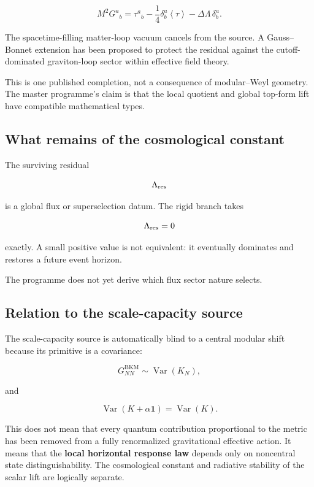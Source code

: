 \documentclass[
  11pt,
  letterpaper,
]{article}
\begin{document}
\[
M^2G^a{}_b
=\tau^a{}_b-\frac14\delta^a_b\left\langle \tau\right\rangle-\Delta\Lambda\,\delta^a_b.
\]

The spacetime-filling matter-loop vacuum cancels from the source. A
Gauss--Bonnet extension has been proposed to protect the residual
against the cutoff-dominated graviton-loop sector within effective field
theory.

This is one published completion, not a consequence of modular--Weyl
geometry. The master programme's claim is that the local quotient and
global top-form lift have compatible mathematical types.

\subsection{What remains of the cosmological
constant}\label{what-remains-of-the-cosmological-constant}

The surviving residual

\[
\Lambda_{\rm res}
\]

is a global flux or superselection datum. The rigid branch takes

\[
\Lambda_{\rm res}=0
\]

exactly. A small positive value is not equivalent: it eventually
dominates and restores a future event horizon.

The programme does not yet derive which flux sector nature selects.

\subsection{Relation to the scale-capacity
source}\label{relation-to-the-scale-capacity-source}

The scale-capacity source is automatically blind to a central modular
shift because its primitive is a covariance:

\[
G^{\mathrm{BKM}}_{NN}\sim\operatorname{Var}(K_N),
\]

and

\[
\operatorname{Var}(K+\alpha\mathbf1)=\operatorname{Var}(K).
\]

This does not mean that every quantum contribution proportional to the
metric has been removed from a fully renormalized gravitational
effective action. It means that the \textbf{local horizontal response
law} depends only on noncentral state distinguishability. The
cosmological constant and radiative stability of the scalar lift are
logically separate.
\end{document}
